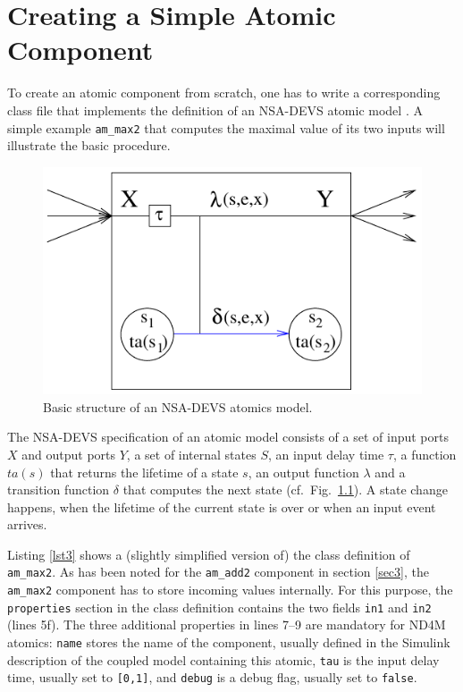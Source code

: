 \documentclass[12pt,oneside,a4paper,bibtotoc,BCOR=0pt,DIV=20]{scrreprt}
\newcommand{\cft}[1]{\mbox{\texttt{#1}}}   %
\begin{document}
\chapter{Creating a Simple Atomic Component} \label{sec7}

To create an atomic component from scratch, one has to write a corresponding
class file that implements the definition of an NSA-DEVS atomic model
\cite{nsaSimulator2}. A simple example \cft{am\_max2} that computes the maximal
value of its two inputs will illustrate the basic procedure.

\begin{figure}[ht]
\centering
\includegraphics[width=0.40\columnwidth]{images/bild11.pdf}
\caption{Basic structure of an NSA-DEVS atomics model.}
\label{fig_11}
\end{figure}

The NSA-DEVS specification of an atomic model consists of a set of input ports
$X$ and output ports $Y$, a set of internal states $S$, an input delay time
$\tau$, a function $ta(s)$ that returns the lifetime of a state $s$, an output
function $\lambda$ and a transition function $\delta$ that computes the next
state (cf.\ Fig.\ \ref{fig_11}). A state change happens, when the lifetime of
the current state is over or when an input event arrives.

Listing \ref{lst3} shows a (slightly simplified version of) the class
definition of \cft{am\_max2}. As has been noted for the \cft{am\_add2}
component in section \ref{sec3}, the \cft{am\_max2} component has to store
incoming values internally. For this purpose, the \cft{properties} section in
the class definition contains the two fields \cft{in1} and \cft{in2} (lines
5f). The three additional properties in lines 7--9 are mandatory for ND4M
atomics: \cft{name} stores the name of the component, usually defined in the
Simulink description of the coupled model containing this atomic, \cft{tau} is
the input delay time, usually set to \cft{[0,1]}, and \cft{debug} is a debug
flag, usually set to \cft{false}.
\end{document}
